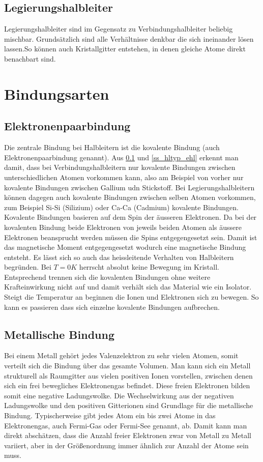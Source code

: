 	\subsection{Legierungshalbleiter} \label{ss_hltyp_lhl}
	Legierungshalbleiter sind im Gegensatz zu Verbindungshalbleiter beliebig mischbar. Grundsätzlich sind alle Verhältnisse denkbar die sich ineinander lösen lassen.So können auch Kristallgitter entstehen, in denen gleiche Atome direkt benachbart sind.
	
\section{Bindungsarten}
	\subsection{Elektronenpaarbindung}
	Die zentrale Bindung bei Halbleitern ist die kovalente Bindung (auch Elektronenpaarbindung genannt). Aus \ref{ss_hltyp_lhl} und \ref{ss_hltyp_ehl} erkennt man damit, dass bei Verbindungshalbleitern nur kovalente Bindungen zwischen unterschiedlichen Atomen vorkommen kann, also am Beispiel von vorher nur kovalente Bindungen zwischen Gallium udn Stickstoff. Bei Legierungshalbleitern können dagegen auch kovalente Bindungen zwischen selben Atomen vorkommen, zum Beispiel Si-Si (Silizium) oder Ca-Ca (Cadmium) kovalente Bindungen.
	Kovalente Bindungen basieren auf dem Spin der äusseren Elektronen. Da bei der kovalenten Bindung beide Elektronen von jeweils beiden Atomen als äussere Elektronen beansprucht werden müssen die Spins entgegengesetzt sein. Damit ist das magnetische Moment entgegengesetzt wodurch eine magnetische Bindung entsteht. Es lässt sich so auch das heissleitende Verhalten von Halbleitern begründen. Bei $T=0K$ herrscht absolut keine Bewegung im Kristall. Entsprechend trennen sich die kovalenten Bindungen ohne weitere Krafteinwirkung nicht auf und damit verhält sich das Material wie ein Isolator. Steigt die Temperatur an beginnen die Ionen und Elektronen sich zu bewegen. So kann es passieren dass sich einzelne kovalente Bindungen aufbrechen.
	\subsection{Metallische Bindung}
	Bei einem Metall gehört jedes Valenzelektron zu sehr vielen Atomen, somit verteilt sich die Bindung über das gesamte Volumen. Man kann sich ein Metall strukturell als Raumgitter aus vielen positiven Ionen vorstellen, zwischen denen sich ein frei bewegliches Elektronengas befindet. Diese freien Elektronen bilden somit eine negative Ladungswolke. Die Wechselwirkung aus der negativen Ladungswolke und den positiven Gitterionen sind Grundlage für die metallische Bindung. Typischerweise gibt jedes Atom ein bis zwei Atome in das Elektronengas, auch Fermi-Gas oder Fermi-See genannt, ab. Damit kann man direkt abschätzen, dass die Anzahl freier Elektronen zwar von Metall zu Metall variiert, aber in der Größenordnung immer ähnlich zur Anzahl der Atome sein muss.
